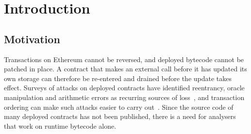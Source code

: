 \documentclass[pdflatex,sn-mathphys]{sn-jnl}
\theoremstyle{thmstyletwo}
\theoremstyle{thmstyletwo}
\begin{document}
\section{Introduction}\label{sec:intro}

\subsection{Motivation}\label{sec:intro:motivation}
Transactions on Ethereum cannot be reversed, and deployed bytecode cannot be patched in place. A contract that makes an external call before it has updated its own storage can therefore be re-entered and drained before the update takes effect. Surveys of attacks on deployed contracts have identified reentrancy, oracle manipulation and arithmetic errors as recurring sources of loss~\cite{zhou2023sok,chen2020survey}, and transaction ordering can make such attacks easier to carry out~\cite{daian2020flash}. Since the source code of many deployed contracts has not been published, there is a need for analysers that work on runtime bytecode alone.
\end{document}
